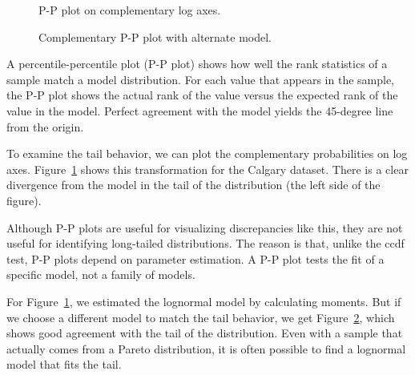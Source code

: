 \documentclass{elsart}
\begin{document}

\begin{figure}[tb]
\centerline{}
\caption{P-P plot on complementary log axes.}
\label{fig.logpp}
\end{figure}

\begin{figure}[tb]
\centerline{}
\caption{Complementary P-P plot with alternate model.}
\label{fig.altpp}
\end{figure}


A percentile-percentile plot (P-P plot) shows how well the rank
statistics of a sample match a model distribution.  For each value
that appears in the sample, the P-P plot shows the actual rank of
the value versus the expected rank of the value in the model.
Perfect agreement with the model yields the 45-degree line from
the origin.


To examine the tail behavior, we can plot the complementary
probabilities on log axes.  Figure~\ref{fig.logpp} shows this
transformation for the Calgary dataset.  There is a clear
divergence from the model in the tail of the distribution
(the left side of the figure).

Although P-P plots are useful for
visualizing discrepancies like this, they are not useful for
identifying long-tailed distributions.  The reason is that, unlike the
ccdf test, P-P plots depend on parameter estimation.  A P-P plot tests
the fit of a specific model, not a family of models.

For Figure~\ref{fig.logpp}, we estimated the lognormal model by
calculating moments.  But if we choose a different model to match the
tail behavior, we get Figure~\ref{fig.altpp}, which shows good
agreement with the tail of the distribution.  Even with a sample that
actually comes from a Pareto distribution, it is often possible to
find a lognormal model that fits the tail.
\end{document}
